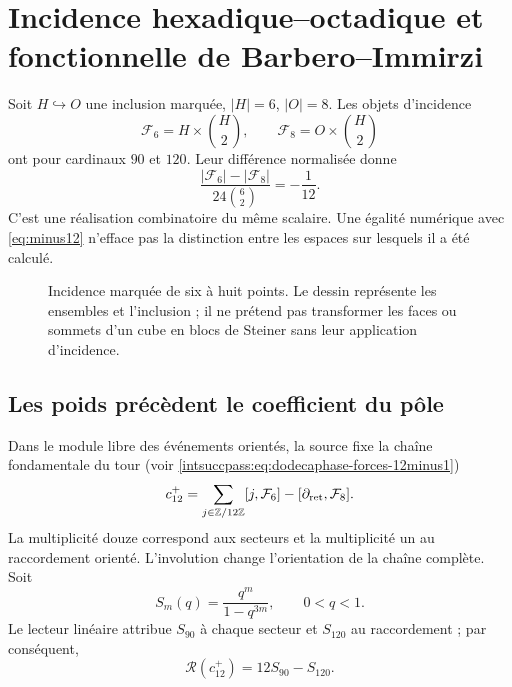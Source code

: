 \section{Incidence hexadique--octadique et fonctionnelle de Barbero--Immirzi}
\label{sec:barbero}
Soit $H\hookrightarrow O$ une inclusion marquée, $|H|=6$, $|O|=8$.
Les objets d'incidence
\[
\mathcal F_6=H\times\binom H2,\qquad
\mathcal F_8=O\times\binom H2
\]
ont pour cardinaux $90$ et $120$. Leur différence normalisée donne
\[
\frac{|\mathcal F_6|-|\mathcal F_8|}{24\binom62}=-\frac1{12}.
\]
C'est une réalisation combinatoire du même scalaire.
Une égalité numérique avec \eqref{eq:minus12} n'efface pas
la distinction entre les espaces sur lesquels il a été calculé.

\begin{figure}[htbp]
\centering
{}
\caption{Incidence marquée de six à huit points. Le dessin représente
les ensembles et l'inclusion ; il ne prétend pas transformer les faces ou sommets
d'un cube en blocs de Steiner sans leur application d'incidence.}
\end{figure}

\subsection{Les poids précèdent le coefficient du pôle}
Dans le module libre des événements orientés, la source fixe la chaîne
fondamentale du tour (voir \ref{intsuccpass:eq:dodecaphase-forces-12minus1})
\[
c_{12}^{+}=
\sum_{j\in\mathbb Z/12\mathbb Z}[j,\mathcal F_6]
-[\partial_{\rm ret},\mathcal F_8].
\]
La multiplicité douze correspond aux secteurs et la multiplicité un
au raccordement orienté. L'involution change l'orientation de la chaîne
complète. Soit
\[
S_m(q)=\frac{q^m}{1-q^{3m}},\qquad 0<q<1.
\]
Le lecteur linéaire attribue $S_{90}$ à chaque secteur et $S_{120}$ au raccordement ;
par conséquent,
\[
\mathscr R(c_{12}^{+})=12S_{90}-S_{120}.
\]

